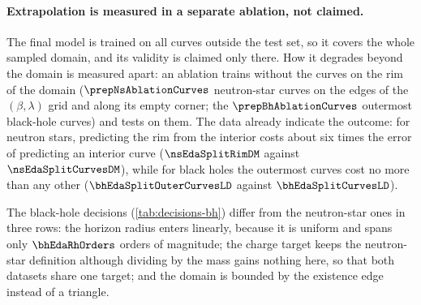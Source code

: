 \paragraph{Extrapolation is measured in a separate ablation, not claimed.}
The final model is trained on all curves outside the test set, so it covers the whole sampled domain, and its validity is claimed only there. How it degrades beyond the domain is measured apart: an ablation trains without the curves on the rim of the domain ($\prepNsAblationCurves$ neutron-star curves on the edges of the $(\beta, \lambda)$ grid and along its empty corner; the $\prepBhAblationCurves$ outermost black-hole curves) and tests on them. The data already indicate the outcome: for neutron stars, predicting the rim from the interior costs about six times the error of predicting an interior curve ($\nsEdaSplitRimDM$ against $\nsEdaSplitCurvesDM$), while for black holes the outermost curves cost no more than any other ($\bhEdaSplitOuterCurvesLD$ against $\bhEdaSplitCurvesLD$).


\FloatBarrier

The black-hole decisions (\cref{tab:decisions-bh}) differ from the neutron-star ones in three rows: the horizon radius enters linearly, because it is uniform and spans only $\bhEdaRhOrders$ orders of magnitude; the charge target keeps the neutron-star definition although dividing by the mass gains nothing here, so that both datasets share one target; and the domain is bounded by the existence edge instead of a triangle.


\FloatBarrier

